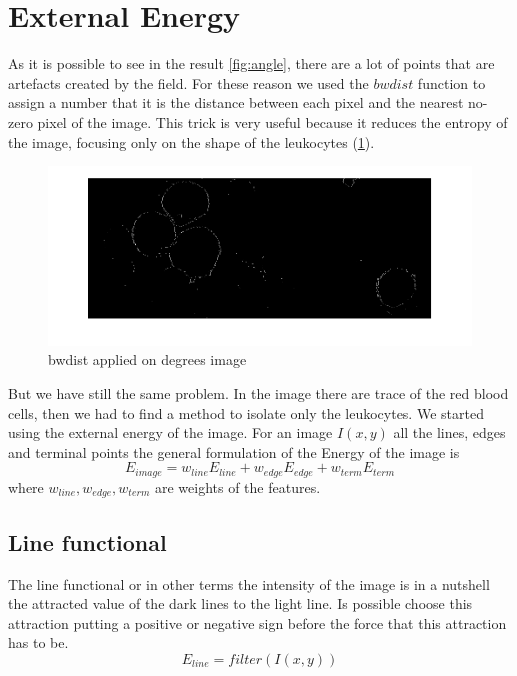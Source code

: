 \section{External Energy}
As it is possible to see in the result \ref{fig:angle}, there are a lot of points that are artefacts created by the field. For these reason we used the $bwdist$ function to assign a number that it is the distance between each pixel and the nearest no-zero pixel of the image. This trick is very useful because it reduces the entropy of the image, focusing only on the shape of the leukocytes (\ref{fig:bwdistangle}).
\begin{figure}
	\begin{center}
		\centering
		\includegraphics[scale=0.5]{img/bwdistAngle.png}
		\caption{bwdist applied on degrees image}
		\label{fig:bwdistangle}
	\end{center}
\end{figure}
But we have still the same problem. In the image there are trace of the red blood cells, then we had to find a method to isolate only the leukocytes. We started using the external energy of the image. For an image $I(x,y)$ all the lines, edges and terminal points the general formulation of the Energy of the image is
\begin{equation}
 E_{image}=w_{line}E_{line} + w_{edge}E_{edge} + w_{term}E_{term}
\end{equation}
where $w_{line}, w_{edge}, w_{term}$ are weights of the features.

\subsection{Line functional}
The line functional or in other terms the intensity of the image is in a nutshell the attracted value of the dark lines to the light line. Is possible choose this attraction putting a positive or negative sign before the force that this attraction has to be.
\begin{equation}
	E_{{line}}=filter(I(x,y))
\end{equation}

